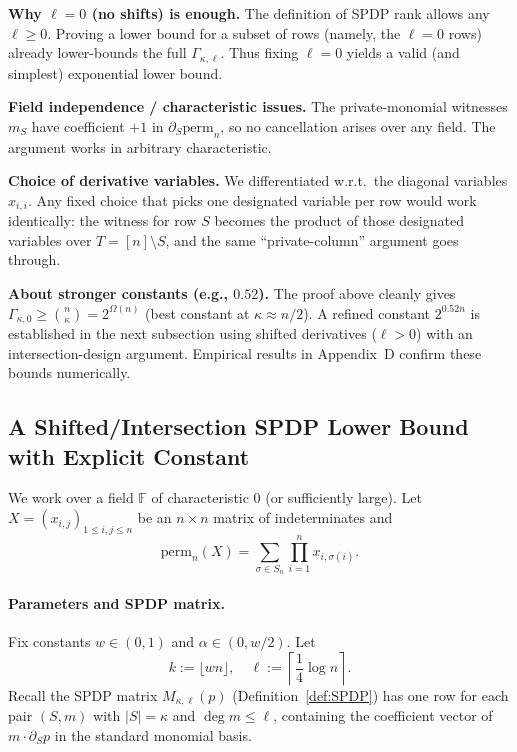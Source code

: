 \documentclass[12pt]{article}
\theoremstyle{definition}
\theoremstyle{definition}
\theoremstyle{remark}
\theoremstyle{remark}
\begin{document}
\textbf{Why $\ell = 0$ (no shifts) is enough.}
The definition of SPDP rank allows any $\ell \geq 0$. Proving a lower bound for a subset of rows (namely, the $\ell = 0$ rows) already lower-bounds the full $\Gamma_{\kappa,\ell}$. Thus fixing $\ell = 0$ yields a valid (and simplest) exponential lower bound.

\textbf{Field independence / characteristic issues.}
The private-monomial witnesses $m_S$ have coefficient $+1$ in $\partial_S \mathrm{perm}_n$, so no cancellation arises over any field. The argument works in arbitrary characteristic.

\textbf{Choice of derivative variables.}
We differentiated w.r.t.\ the diagonal variables $x_{i,i}$. Any fixed choice that picks one designated variable per row would work identically: the witness for row $S$ becomes the product of those designated variables over $T = [n] \setminus S$, and the same ``private-column'' argument goes through.

\textbf{About stronger constants (e.g., $0.52$).}
The proof above cleanly gives $\Gamma_{\kappa,0} \geq \binom{n}{\kappa} = 2^{\Omega(n)}$ (best constant at $\kappa \approx n/2$). A refined constant $2^{0.52n}$ is established in the next subsection using shifted derivatives ($\ell > 0$) with an intersection-design argument. Empirical results in Appendix~D confirm these bounds numerically.

\subsection{A Shifted/Intersection SPDP Lower Bound with Explicit Constant}
\label{sec:perm-shifted-constant}

We work over a field $\mathbb{F}$ of characteristic $0$ (or sufficiently large). Let $X = (x_{i,j})_{1 \leq i,j \leq n}$ be an $n \times n$ matrix of indeterminates and
\[
\mathrm{perm}_n(X) = \sum_{\sigma \in S_n} \prod_{i=1}^n x_{i,\sigma(i)}.
\]

\paragraph{Parameters and SPDP matrix.}
Fix constants $w \in (0,1)$ and $\alpha \in (0, w/2)$. Let
\[
k := \lfloor w n \rfloor, \quad \ell := \left\lceil \frac{1}{4} \log n \right\rceil.
\]
Recall the SPDP matrix $M_{\kappa,\ell}(p)$ (Definition~\ref{def:SPDP}) has one row for each pair $(S,m)$ with $|S| = \kappa$ and $\deg m \leq \ell$, containing the coefficient vector of $m \cdot \partial_S p$ in the standard monomial basis.
\end{document}
